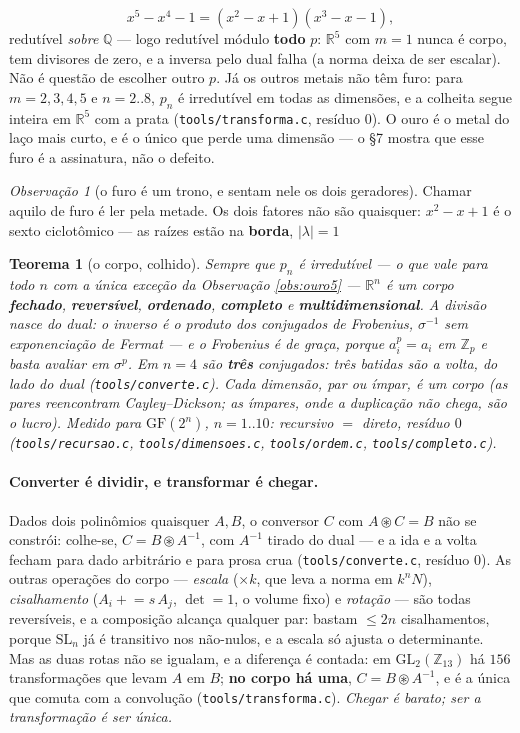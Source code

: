 \documentclass[11pt]{article}
\newcommand{\code}[1]{\texttt{\small #1}}
\newcommand{\Z}{\mathbb Z}
\newcommand{\R}{\mathbb R}
\newcommand{\GF}{\mathrm{GF}}
\theoremstyle{plain}
\newtheorem{teorema}{Teorema}
\theoremstyle{remark}
\newtheorem{obs}{Observação}
\begin{document}
\[
 x^5-x^4-1=(x^2-x+1)(x^3-x-1),
\]
redutível \emph{sobre} $\mathbb Q$ --- logo redutível módulo \textbf{todo} $p$: $\R^5$ com $m=1$ nunca
é corpo, tem divisores de zero, e a inversa pelo dual falha (a norma deixa de ser escalar). Não é
questão de escolher outro $p$. Já os outros metais não têm furo: para $m=2,3,4,5$ e $n=2..8$, $p_n$ é
irredutível em todas as dimensões, e a colheita segue inteira em $\R^5$ com a prata
(\code{tools/transforma.c}, resíduo $0$). O ouro é o metal do laço mais curto, e é o único que perde
uma dimensão --- o §7 mostra que esse furo é a assinatura, não o defeito.

\begin{obs}[o furo é um trono, e sentam nele os dois geradores]\label{obs:trono-2}
Chamar aquilo de furo é ler pela metade. Os dois fatores não são quaisquer:
$x^2-x+1$ é o sexto ciclotômico --- as raízes estão na \textbf{borda}, $|\lambda|=1$


\begin{teorema}[o corpo, colhido]
Sempre que $p_n$ é irredutível --- o que vale para todo $n$ com a única exceção da Observação
\ref{obs:ouro5} --- $\R^n$ é um corpo \textbf{fechado}, \textbf{reversível}, \textbf{ordenado},
\textbf{completo} e \textbf{multidimensional}. A divisão nasce do \emph{dual}: o inverso é o produto
dos conjugados de Frobenius, $\sigma^{-1}$ sem exponenciação de Fermat --- e o Frobenius é de graça,
porque $a_i^p=a_i$ em $\Z_p$ e basta avaliar em $\sigma^p$. Em $n=4$ são \textbf{três} conjugados:
três batidas são a volta, do lado do dual (\code{tools/converte.c}). Cada dimensão, par ou ímpar, é um
corpo (as pares reencontram Cayley--Dickson; as ímpares, onde a duplicação não chega, são o lucro).
Medido para $\GF(2^n)$, $n=1..10$: recursivo $=$ direto, resíduo $0$ (\code{tools/recursao.c},
\code{tools/dimensoes.c}, \code{tools/ordem.c}, \code{tools/completo.c}).
\end{teorema}

\paragraph{Converter é dividir, e transformar é chegar.} Dados dois polinômios quaisquer $A,B$, o
conversor $C$ com $A\circledast C=B$ não se constrói: colhe-se, $C=B\circledast A^{-1}$, com $A^{-1}$
tirado do dual --- e a ida e a volta fecham para dado arbitrário e para prosa crua
(\code{tools/converte.c}, resíduo $0$). As outras operações do corpo --- \emph{escala} ($\times k$, que
leva a norma em $k^nN$), \emph{cisalhamento} ($A_i\mathrel{+}=s\,A_j$, $\det=1$, o volume fixo) e
\emph{rotação} --- são todas reversíveis, e a composição alcança qualquer par: bastam $\le 2n$
cisalhamentos, porque $\mathrm{SL}_n$ já é transitivo nos não-nulos, e a escala só ajusta o
determinante. Mas as duas rotas não se igualam, e a diferença é contada:
em $\mathrm{GL}_2(\Z_{13})$ há $156$ transformações que levam $A$ em $B$; \textbf{no corpo há uma},
$C=B\circledast A^{-1}$, e é a única que comuta com a convolução (\code{tools/transforma.c}).
\emph{Chegar é barato; ser a transformação é ser única.}


\end{obs}
\end{document}
